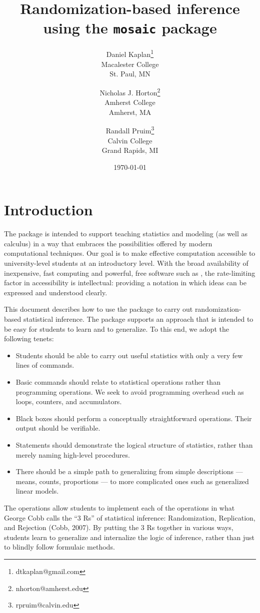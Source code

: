 \documentclass[11pt]{article}\usepackage[]{graphicx}\usepackage[]{color}
\title{Randomization-based inference using the {\tt mosaic} package}
\author{Daniel Kaplan\thanks{dtkaplan@gmail.com} \\ \footnotesize Macalester College \\
\footnotesize St. Paul, MN
\and Nicholas J. Horton\thanks{nhorton@amherst.edu} \\ \footnotesize Amherst College \\
\footnotesize Amherst, MA \and 
Randall Pruim\thanks{rpruim@calvin.edu}
\\ \footnotesize Calvin College \\
\footnotesize Grand Rapids, MI
}
\date{\today}
\begin{document}

\maketitle

\tableofcontents





\section{Introduction}

The  package is intended to support teaching statistics and modeling (as well as calculus) in a way that embraces the possibilities offered by modern computational techniques.
Our goal is to make effective computation accessible to university-level students at an introductory level.  With the broad availability of inexpensive, fast computing and powerful, free software such as \R, the rate-limiting factor in accessibility is intellectual: providing a notation in which ideas can be expressed and understood clearly.  

This document describes how to use the  package to carry out randomization-based statistical inference.  The  package supports an approach that is intended to be easy for students to learn and to generalize.  To this end, we adopt the following tenets:
\begin{itemize}
\item Students should be able to carry out useful statistics with only a very few lines of commands.
\item Basic commands should relate to statistical operations rather than programming operations.  We seek to avoid programming overhead such as loops, counters, and accumulators.
\item Black boxes should perform a conceptually straightforward operations.  Their output should be verifiable.
\item Statements should demonstrate the logical structure of statistics, rather than merely naming high-level procedures.
\item There should be a simple path to generalizing from simple descriptions --- means, counts, proportions --- to more complicated ones such as generalized linear models.
\end{itemize}

The  operations allow students to implement each of the
operations in what George Cobb calls the ``3 Rs'' of statistical
inference: Randomization, Replication, and Rejection (Cobb, 2007). 
By putting the 3 Rs together in various ways, students learn to
generalize and internalize the logic of inference, rather than just
to blindly follow formulaic methods.
\end{document}
